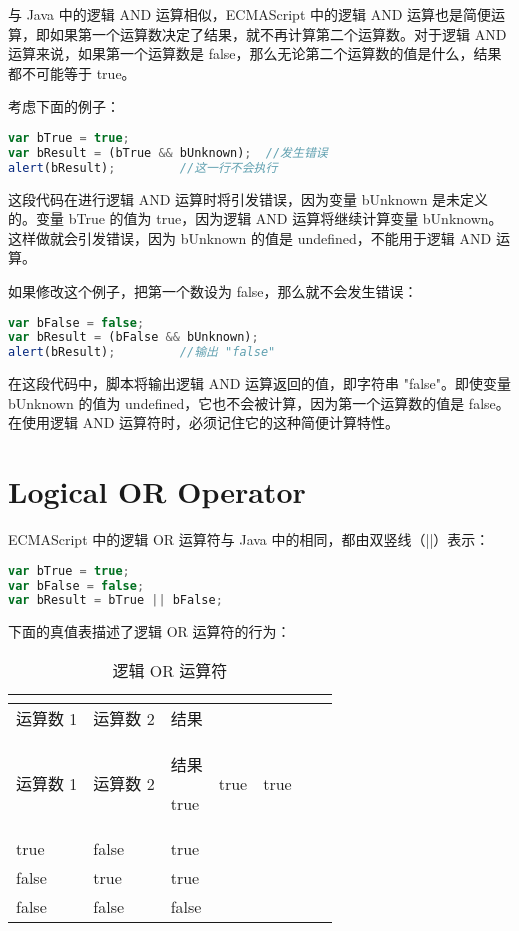 与 Java 中的逻辑 AND 运算相似，ECMAScript 中的逻辑 AND 运算也是简便运算，即如果第一个运算数决定了结果，就不再计算第二个运算数。对于逻辑 AND 运算来说，如果第一个运算数是 false，那么无论第二个运算数的值是什么，结果都不可能等于 true。

考虑下面的例子：

\begin{lstlisting}[language=JavaScript]
var bTrue = true;
var bResult = (bTrue && bUnknown);	//发生错误
alert(bResult);			//这一行不会执行
\end{lstlisting}

这段代码在进行逻辑 AND 运算时将引发错误，因为变量 bUnknown 是未定义的。变量 bTrue 的值为 true，因为逻辑 AND 运算将继续计算变量 bUnknown。这样做就会引发错误，因为 bUnknown 的值是 undefined，不能用于逻辑 AND 运算。

如果修改这个例子，把第一个数设为 false，那么就不会发生错误：


\begin{lstlisting}[language=JavaScript]
var bFalse = false;
var bResult = (bFalse && bUnknown);
alert(bResult);			//输出 "false"
\end{lstlisting}

在这段代码中，脚本将输出逻辑 AND 运算返回的值，即字符串 "false"。即使变量 bUnknown 的值为 undefined，它也不会被计算，因为第一个运算数的值是 false。在使用逻辑 AND 运算符时，必须记住它的这种简便计算特性。




\section{Logical OR Operator}


ECMAScript 中的逻辑 OR 运算符与 Java 中的相同，都由双竖线（||）表示：


\begin{lstlisting}[language=JavaScript]
var bTrue = true;
var bFalse = false;
var bResult = bTrue || bFalse;
\end{lstlisting}


下面的真值表描述了逻辑 OR 运算符的行为：


\begin{longtable}{|m{120pt}|m{120pt}|m{120pt}|}
\tabularnewline\hline
运算数 1	&运算数 2	&结果
\endhead

\caption{逻辑 OR 运算符}\\
\hline
运算数 1	&运算数 2	&结果
\endfirsthead

\endfoot


\endlastfoot
\hline
true	&true	&true\\
\hline
true	&false	&true\\
\hline
false	&true	&true\\
\hline
false	&false	&false\\
\hline
\end{longtable}

